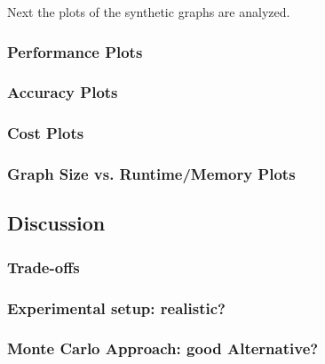 Next the plots of the synthetic graphs are analyzed. 


\subsubsection{Performance Plots}
\subsubsection{Accuracy Plots}
\subsubsection{Cost Plots}
\subsubsection{Graph Size vs. Runtime/Memory Plots}

\subsection{Discussion}
\subsubsection{Trade-offs}
\subsubsection{Experimental setup: realistic?}
\subsubsection{Monte Carlo Approach: good Alternative?}

